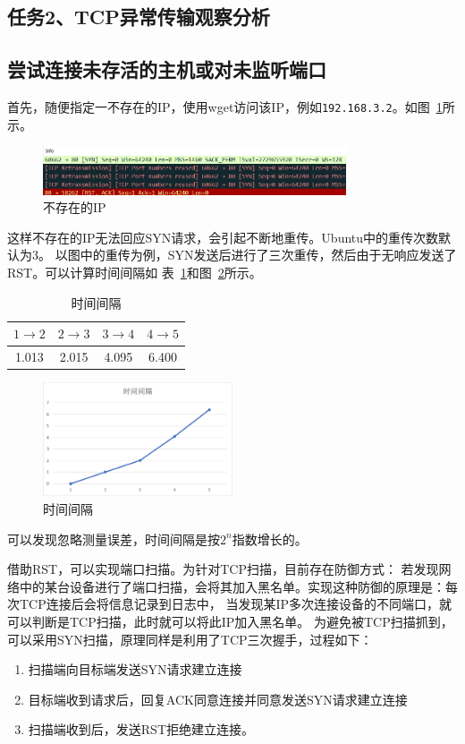 \documentclass[a4paper,twoside]{article}
\begin{document}
\begin{spacing}{1.2}
\section{任务2、TCP异常传输观察分析}

\subsection{尝试连接未存活的主机或对未监听端口}

首先，随便指定一不存在的IP，使用wget访问该IP，例如\texttt{192.168.3.2}。如图~\ref{fig:badip}所示。
\begin{figure}[htb]
	\centering
	\caption{不存在的IP}
	\label{fig:badip}
	\includegraphics[width=0.8\textwidth]{badip.png}
\end{figure}
这样不存在的IP无法回应SYN请求，会引起不断地重传。Ubuntu中的重传次数默认为3。
以图中的重传为例，SYN发送后进行了三次重传，然后由于无响应发送了RST。可以计算时间间隔如
表~\ref{tbl:retrintv}和图~\ref{fig:retrintv}所示。
\begin{table}[htb]
	\centering
	\caption{时间间隔}
	\label{tbl:retrintv}
	\begin{tabular}{c|c|c|c}
		\toprule
		\hline
		$1\longrightarrow2$&$2\longrightarrow3$&$3\longrightarrow4$&$4\longrightarrow5$\\
		\hline
		1.013&2.015&4.095&6.400 \\
		\hline
		\bottomrule
	\end{tabular}
\end{table}
\begin{figure}[H]
	\centering
	\caption{时间间隔}
	\label{fig:retrintv}
	\includegraphics[width=0.5\textwidth]{interval.png}
\end{figure}
可以发现忽略测量误差，时间间隔是按$2^n$指数增长的。

借助RST，可以实现端口扫描。为针对TCP扫描，目前存在防御方式：
若发现网络中的某台设备进行了端口扫描，会将其加入黑名单。实现这种防御的原理是：每次TCP连接后会将信息记录到日志中，
当发现某IP多次连接设备的不同端口，就可以判断是TCP扫描，此时就可以将此IP加入黑名单。
为避免被TCP扫描抓到，可以采用SYN扫描，原理同样是利用了TCP三次握手，过程如下：
\begin{enumerate}
	\item 扫描端向目标端发送SYN请求建立连接
	\item 目标端收到请求后，回复ACK同意连接并同意发送SYN请求建立连接
	\item 扫描端收到后，发送RST拒绝建立连接。
\end{enumerate}


\end{spacing}
\end{document}
